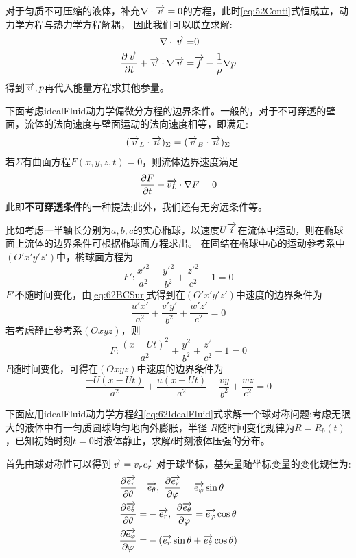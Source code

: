 对于匀质不可压缩的液体，补充$\nabla \cdot \overrightarrow{v}=0$的方程，此时\eqref{eq:52Conti}式恒成立，动力学方程与热力学方程解耦，
因此我们可以联立求解:
\begin{align}\notag
\nabla \cdot \overrightarrow{v}=&0\\
 \frac{\partial \overrightarrow{v}}{\partial t}+\overrightarrow{v}\cdot\nabla\overrightarrow{v} =&\overrightarrow{f}-\frac{1}{\rho}\nabla  p \label{eq:62IdealFluid}
\end{align}
得到$\overrightarrow{v},p$再代入能量方程求其他参量。

下面考虑\gls{idealFluid}动力学偏微分方程的边界条件。一般的，对于不可穿透的壁面，流体的法向速度与壁面运动的法向速度相等，即满足:
\begin{equation}
(\overrightarrow{v}_L\cdot \overrightarrow{n})_{\Sigma}=(\overrightarrow{v}_B\cdot \overrightarrow{n})_{\Sigma}
\end{equation}
若$\Sigma$有曲面方程$F(x,y,z,t)=0$，则流体边界速度满足
\begin{equation}\label{eq:62BCSur}
\frac{\partial F}{\partial t} + \overrightarrow{v_L} \cdot \nabla F=0
\end{equation}
此即\textbf{不可穿透条件}的一种提法;此外，我们还有无穷远条件等。

比如考虑一半轴长分别为$a,b,c$的实心椭球，以速度$U\overrightarrow{i}$在流体中运动，则在椭球面上流体的边界条件可根据椭球面方程求出。
在固结在椭球中心的运动参考系中$(O'x'y'z')$中，椭球面方程为
\begin{equation}
F':\frac{x'^2}{a^2}+\frac{y'^2}{b^2}+\frac{z'^2}{c^2}-1=0
\end{equation}
$F'$不随时间变化，由\eqref{eq:62BCSur}式得到在$(O'x'y'z')$中速度的边界条件为
\begin{equation}
\frac{u'x'}{a^2}+\frac{v'y'}{b^2}+\frac{w'z'}{c^2}=0
\end{equation}
若考虑静止参考系$(Oxyz)$，则
\begin{equation}
F:\frac{(x-Ut)^2}{a^2}+\frac{y^2}{b^2}+\frac{z^2}{c^2}-1=0
\end{equation}
$F$随时间变化，可得在$(Oxyz)$中速度的边界条件为
\begin{equation}
\frac{-U(x-Ut)}{a^2}+\frac{u(x-Ut)}{a^2}+\frac{vy}{b^2}+\frac{wz}{c^2}=0
\end{equation}

下面应用\gls{idealFluid}动力学方程组\eqref{eq:62IdealFluid}式求解一个球对称问题:考虑无限大的液体中有一匀质圆球均匀地向外膨胀，半径
$R$随时间变化规律为$R=R_b(t)$，已知初始时刻$t=0$时液体静止，求解$t$时刻液体压强的分布。

首先由球对称性可以得到$\overrightarrow{v}=v_r\overrightarrow{e_r}$
对于球坐标，基矢量随坐标变量的变化规律为\cite{Del}:
\begin{align}
\frac{\partial \overrightarrow{e_r}}{\partial \theta}=&\overrightarrow{e_{\theta}},\,\,  \frac{\partial \overrightarrow{e_r}}{\partial \varphi}=\overrightarrow{e_{\varphi}}\sin\theta\\
\frac{\partial \overrightarrow{e_{\theta}}}{\partial \theta}=&-\overrightarrow{e_r},\,\,  \frac{\partial \overrightarrow{e_{\theta}}}{\partial \varphi}=\overrightarrow{e_{\varphi}}\cos\theta\\
\frac{\partial \overrightarrow{e_{\varphi}}}{\partial \varphi}=&-(\overrightarrow{e_r}\sin\theta+\overrightarrow{e_{\theta}}\cos\theta)
\end{align}

